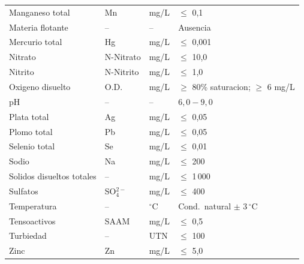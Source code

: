 \documentclass[12pt,a4paper]{article}
\begin{document}
\begin{longtable}{p{4.5cm}p{2.0cm}p{2.0cm}p{3.5cm}}
Manganeso total & Mn & mg/L & $\leq$ 0,1 \\
Materia flotante & -- & -- & Ausencia \\
Mercurio total & Hg & mg/L & $\leq$ 0,001 \\
Nitrato & N-Nitrato & mg/L & $\leq$ 10,0 \\
Nitrito & N-Nitrito & mg/L & $\leq$ 1,0 \\
Oxigeno disuelto & O.D. & mg/L & $\geq$ 80\% saturacion; $\geq$ 6 mg/L \\
pH & -- & -- & $6,0 - 9,0$ \\
Plata total & Ag & mg/L & $\leq$ 0,05 \\
Plomo total & Pb & mg/L & $\leq$ 0,05 \\
Selenio total & Se & mg/L & $\leq$ 0,01 \\
Sodio & Na & mg/L & $\leq$ 200 \\
Solidos disueltos totales & -- & mg/L & $\leq$ 1\,000 \\
Sulfatos & SO$_4^{2-}$ & mg/L & $\leq$ 400 \\
Temperatura & -- & $^\circ$C & Cond.\ natural $\pm$ 3\,$^\circ$C \\
Tensoactivos & SAAM & mg/L & $\leq$ 0,5 \\
Turbiedad & -- & UTN & $\leq$ 100 \\
Zinc & Zn & mg/L & $\leq$ 5,0 \\
\end{longtable}
\end{document}
